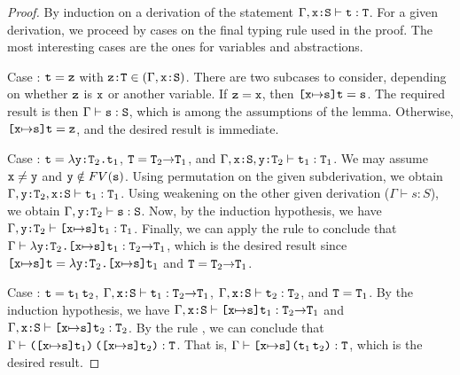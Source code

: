 \documentclass[11pt,twoside=off,numbers=noenddot]{scrbook}
\begin{document}
\begin{proof}
  By induction on a derivation of the statement $\Gamma, \texttt{x:S}
  \vdash \texttt{t} : \texttt{T}$. For a given derivation, we proceed by
  cases on the final typing rule used in the proof. The most
  interesting cases are the ones for variables and abstractions.

  Case : $\texttt{t} = \texttt{z}$ with $\texttt{z:T} \in (\Gamma,
  \texttt{x:S})$. There are two subcases to consider, depending on
  whether $\texttt{z}$ is $\texttt{x}$ or another variable. If $\texttt{z} =
  \texttt{x}$, then $\texttt{[x$\mapsto$s]t} = \texttt{s}$. The required
  result is then $\Gamma \vdash \texttt{s} : \texttt{S}$, which is among
  the assumptions of the lemma. Otherwise, $\texttt{[x$\mapsto$s]t} =
  \texttt{z}$, and the desired result is immediate.

  Case : $\texttt{t} =
  \texttt{$\lambda$y:$\texttt{T}_2$.$\texttt{t}_1$}$, $\texttt{T} =
  \texttt{$\texttt{T}_2$$\rightarrow$$\texttt{T}_1$}$, and $\Gamma,
  \texttt{x:S}, \texttt{y:$\texttt{T}_2$} \vdash \texttt{t}_1 : \texttt{T}_1$. We
  may assume $\texttt{x} \neq \texttt{y}$ and $\texttt{y} \notin FV(\texttt{s})$.
  Using permutation on the given subderivation, we obtain $\Gamma,
  \texttt{y:$\texttt{T}_2$}, \texttt{x:S} \vdash \texttt{t}_1 : \texttt{T}_1$. Using
  weakening on the other given derivation ($\Gamma \vdash s : S$), we
  obtain $\Gamma, \texttt{y:$\texttt{T}_2$} \vdash \texttt{s} : \texttt{S}$. Now,
  by the induction hypothesis, we have $\Gamma, \texttt{y:$\texttt{T}_2$}
  \vdash \texttt{[x$\mapsto$s]t}_1 : \texttt{T}_1$. Finally, we can apply
  the rule  to conclude that $\Gamma \vdash
  \texttt{$\lambda$y:$\texttt{T}_2$.$\texttt{[x$\mapsto$s]t}_1$} :
  \texttt{$\texttt{T}_2$$\rightarrow$$\texttt{T}_1$}$, which is the desired
  result since $\texttt{[x$\mapsto$s]t} =
  \texttt{$\lambda$y:$\texttt{T}_2$.$\texttt{[x$\mapsto$s]t}_1$}$ and $\texttt{T}
  = \texttt{$\texttt{T}_2$$\rightarrow$$\texttt{T}_1$}$.

  Case : $\texttt{t} = \texttt{$\texttt{t}_1$\,$\texttt{t}_2$}$, $\Gamma,
  \texttt{x:S} \vdash \texttt{t}_1 :
  \texttt{$\texttt{T}_2$$\rightarrow$$\texttt{T}_1$}$, $\Gamma, \texttt{x:S}
  \vdash \texttt{t}_2 : \texttt{T}_2$, and $\texttt{T} = \texttt{T}_1$. By the
  induction hypothesis, we have $\Gamma, \texttt{x:S} \vdash
  \texttt{[x$\mapsto$s]t}_1 : \texttt{$\texttt{T}_2$$\rightarrow$$\texttt{T}_1$}$
  and $\Gamma, \texttt{x:S} \vdash \texttt{[x$\mapsto$s]t}_2 : \texttt{T}_2$.
  By the rule , we can conclude that $\Gamma \vdash
  \texttt{([x$\mapsto$s]$\texttt{t}_1$)\,([x$\mapsto$s]$\texttt{t}_2$)} :
  \texttt{T}$. That is, $\Gamma \vdash
  \texttt{[x$\mapsto$s]($\texttt{t}_1$\,$\texttt{t}_2$)} : \texttt{T}$, which is
  the desired result.
\end{proof}
\end{document}
